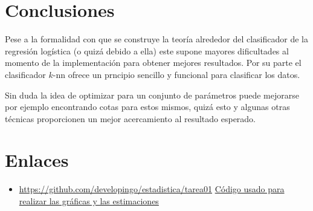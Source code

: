 \documentclass[11pt,letterpaper,reqno]{article}
\begin{document}
\section{Conclusiones}

Pese a la formalidad con que se construye la teoría alrededor del clasificador de la regresión logística (o quizá debido a ella) este supone mayores dificultades al momento de la implementación para obtener mejores resultados. Por su parte el clasificador $k$-nn ofrece un prncipio sencillo y funcional para clasificar los datos.

Sin duda la idea de optimizar para un conjunto de parámetros puede mejorarse por ejemplo encontrando cotas para estos mismos, quizá esto y algunas otras técnicas proporcionen un mejor acercamiento al resultado esperado.

\section*{Enlaces}

\begin{itemize}
	\item \url{https://github.com/developingo/estadistica/tarea01} \href{https://github.com/developingo/estadistica/tarea01}{Código usado para realizar las gráficas y las estimaciones}
\end{itemize}
\end{document}
